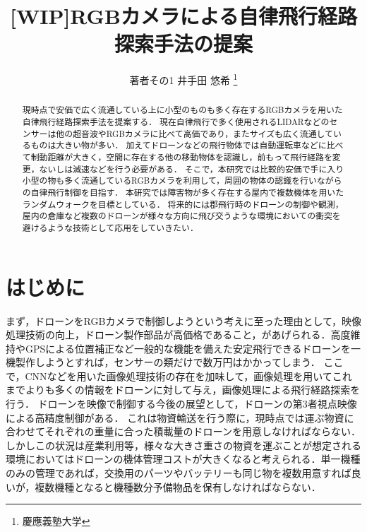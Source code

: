 \documentclass[a4j,10pt]{jsarticle}
\begin{document}

\title{[WIP]RGBカメラによる自律飛行経路探索手法の提案}

\author{
    著者その1 {井手田 悠希} \thanks{慶應義塾大学}
}

\begin{abstract}
現時点で安価で広く流通している上に小型のものも多く存在するRGBカメラを用いた自律飛行経路探索手法を提案する．
現在自律飛行で多く使用されるLIDARなどのセンサーは他の超音波やRGBカメラに比べて高価であり，またサイズも広く流通しているものは大きい物が多い．
加えてドローンなどの飛行物体では自動運転車などに比べて制動距離が大きく，空間に存在する他の移動物体を認識し，前もって飛行経路を変更，ないしは減速などを行う必要がある．
そこで，本研究では比較的安価で手に入り小型の物も多く流通しているRGBカメラを利用して，周囲の物体の認識を行いながらの自律飛行制御を目指す．
本研究では障害物が多く存在する屋内で複数機体を用いたランダムウォークを目標としている．
将来的には郡飛行時のドローンの制御や観測，屋内の倉庫など複数のドローンが様々な方向に飛び交うような環境においての衝突を避けるような技術として応用をしていきたい．

\end{abstract}

\maketitle
\thispagestyle{empty}

\section{はじめに}
まず，ドローンをRGBカメラで制御しようという考えに至った理由として，映像処理技術の向上，ドローン製作部品が高価格であること，があげられる．高度維持やGPSによる位置補正など一般的な機能を備えた安定飛行できるドローンを一機製作しようとすれば，センサーの類だけで数万円はかかってしまう．
ここで，CNNなどを用いた画像処理技術の存在を加味して，画像処理を用いてこれまでよりも多くの情報をドローンに対して与え，画像処理による飛行経路探索を行う．
ドローンを映像で制御する今後の展望として，ドローンの第3者視点映像による高精度制御がある．
これは物資輸送を行う際に，現時点では運ぶ物資に合わせてそれぞれの重量に合った積載量のドローンを用意しなければならない．
しかしこの状況は産業利用等，様々な大きさ重さの物資を運ぶことが想定される環境においてはドローンの機体管理コストが大きくなると考えられる．単一機種のみの管理であれば，交換用のパーツやバッテリーも同じ物を複数用意すれば良いが，複数機種となると機種数分予備物品を保有しなければならない．
\end{document}
